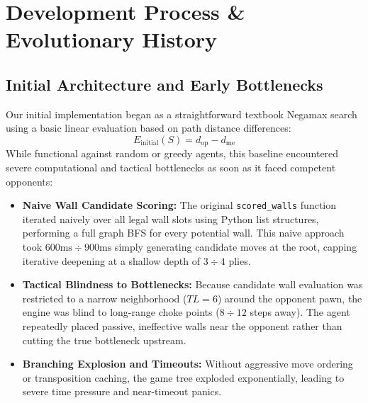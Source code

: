\section{Development Process \& Evolutionary History}

\subsection{Initial Architecture and Early Bottlenecks}
Our initial implementation began as a straightforward textbook Negamax search using a basic linear evaluation based on path distance differences:
\begin{equation}
    E_{\text{initial}}(S) = d_{\text{op}} - d_{\text{me}}
\end{equation}
While functional against random or greedy agents, this baseline encountered severe computational and tactical bottlenecks as soon as it faced competent opponents:
\begin{itemize}[leftmargin=1.5em]
    \item \textbf{Naive Wall Candidate Scoring:} The original \texttt{scored\_walls} function iterated naively over all legal wall slots using Python list structures, performing a full graph BFS for every potential wall. This naive approach took $600\text{ms}\div 900\text{ms}$ simply generating candidate moves at the root, capping iterative deepening at a shallow depth of $3\div 4$ plies.
    \item \textbf{Tactical Blindness to Bottlenecks:} Because candidate wall evaluation was restricted to a narrow neighborhood ($TL = 6$) around the opponent pawn, the engine was blind to long-range choke points ($8\div 12$ steps away). The agent repeatedly placed passive, ineffective walls near the opponent rather than cutting the true bottleneck upstream.
    \item \textbf{Branching Explosion and Timeouts:} Without aggressive move ordering or transposition caching, the game tree exploded exponentially, leading to severe time pressure and near-timeout panics.
\end{itemize}


